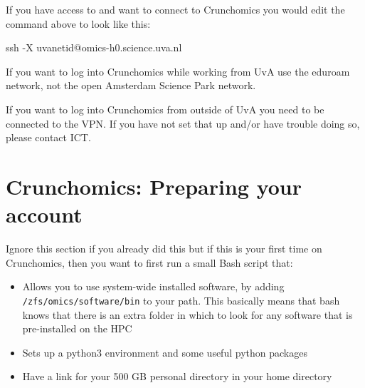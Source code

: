 \documentclass[
  letterpaper,
  DIV=11,
  numbers=noendperiod]{scrreprt}
\newenvironment{Shaded}{}{}
\newcommand{\AttributeTok}[1]{\textcolor[rgb]{0.84,0.23,0.29}{#1}}
\newcommand{\FunctionTok}[1]{\textcolor[rgb]{0.44,0.26,0.76}{#1}}
\newcommand{\NormalTok}[1]{\textcolor[rgb]{0.14,0.16,0.18}{#1}}
\providecommand{\tightlist}{%
  \setlength{\itemsep}{0pt}\setlength{\parskip}{0pt}}\usepackage{longtable,booktabs,array}
\begin{document}
If you have access to and want to connect to Crunchomics you would edit
the command above to look like this:

\begin{Shaded}
\begin{Highlighting}[]
\FunctionTok{ssh} \AttributeTok{{-}X}\NormalTok{ uvanetid@omics{-}h0.science.uva.nl}
\end{Highlighting}
\end{Shaded}

\begin{tcolorbox}[enhanced jigsaw, colframe=quarto-callout-important-color-frame, breakable, opacityback=0, toptitle=1mm, left=2mm, coltitle=black, colbacktitle=quarto-callout-important-color!10!white, title=\textcolor{quarto-callout-important-color}{\faExclamation}\hspace{0.5em}{Important}, rightrule=.15mm, bottomtitle=1mm, titlerule=0mm, colback=white, arc=.35mm, toprule=.15mm, bottomrule=.15mm, leftrule=.75mm, opacitybacktitle=0.6]

If you want to log into Crunchomics while working from UvA use the
eduroam network, not the open Amsterdam Science Park network.

If you want to log into Crunchomics from outside of UvA you need to be
connected to the VPN. If you have not set that up and/or have trouble
doing so, please contact ICT.

\end{tcolorbox}

\section{Crunchomics: Preparing your
account}\label{crunchomics-preparing-your-account}

Ignore this section if you already did this but if this is your first
time on Crunchomics, then you want to first run a small Bash script
that:

\begin{itemize}
\tightlist
\item
  Allows you to use system-wide installed software, by adding
  \texttt{/zfs/omics/software/bin} to your path. This basically means
  that bash knows that there is an extra folder in which to look for any
  software that is pre-installed on the HPC
\item
  Sets up a python3 environment and some useful python packages
\item
  Have a link for your 500 GB personal directory in your home directory
\end{itemize}
\end{document}
